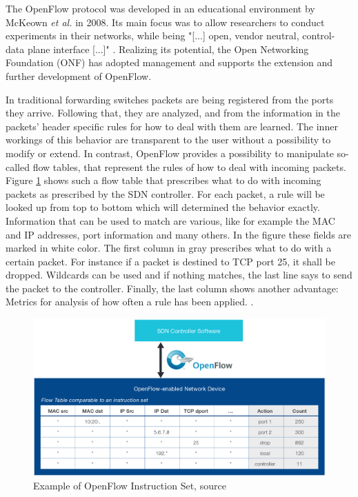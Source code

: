 The OpenFlow protocol was developed in an educational environment by McKeown \textit{et al.} \cite{mckeown2008openflow} in 2008. Its main focus was to allow researchers to conduct experiments in their networks, while being "[...] open, vendor neutral, control-data plane interface [...]" \cite{berde2014onos}. Realizing its potential, the Open Networking Foundation (ONF) has adopted management and supports the extension and further development of OpenFlow.

\newpage
In traditional forwarding switches packets are being registered from the ports they arrive. Following that, they are analyzed, and from the information in the packets' header specific rules for how to deal with them are learned. The inner workings of this behavior are transparent to the user without a possibility to modify or extend. In contrast, OpenFlow provides a possibility to manipulate so-called flow tables, that represent the rules of how to deal with incoming packets. 
Figure \ref{img:of} shows such a flow table that prescribes what to do with incoming packets as prescribed by the SDN controller. For each packet, a rule will be looked up from top to bottom which will determined the behavior exactly. Information that can be used to match are various, like for example the MAC and IP addresses, port information and many others. In the figure these fields are marked in white color. The first column in gray prescribes what to do with a certain packet. For instance if a packet is destined to TCP port 25, it shall be dropped. Wildcards can be used and if nothing matches, the last line says to send the packet to the controller. Finally, the last column shows another advantage: Metrics for analysis of how often a rule has been applied. 
\cite{mckeown2008openflow}. 

\begin{figure}[h]
	\centering
	\includegraphics[width=1\linewidth]{images/of.png}
	\caption{Example of OpenFlow Instruction Set, source \cite{ofWhitePaper}}
	\label{img:of}
\end{figure}

